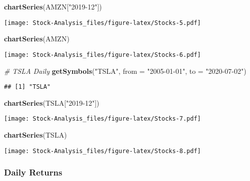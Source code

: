 \documentclass[
]{article}
\newenvironment{Shaded}{\begin{snugshade}}{\end{snugshade}}
\newcommand{\CommentTok}[1]{\textcolor[rgb]{0.56,0.35,0.01}{\textit{#1}}}
\newcommand{\DataTypeTok}[1]{\textcolor[rgb]{0.13,0.29,0.53}{#1}}
\newcommand{\KeywordTok}[1]{\textcolor[rgb]{0.13,0.29,0.53}{\textbf{#1}}}
\newcommand{\NormalTok}[1]{#1}
\newcommand{\StringTok}[1]{\textcolor[rgb]{0.31,0.60,0.02}{#1}}
\begin{document}
\begin{Shaded}
\begin{Highlighting}[]
\KeywordTok{chartSeries}\NormalTok{(AMZN[}\StringTok{"2019-12"}\NormalTok{])}
\end{Highlighting}
\end{Shaded}

\texttt{[image: Stock-Analysis\_files/figure-latex/Stocks-5.pdf]}

\begin{Shaded}
\begin{Highlighting}[]
\KeywordTok{chartSeries}\NormalTok{(AMZN)}
\end{Highlighting}
\end{Shaded}

\texttt{[image: Stock-Analysis\_files/figure-latex/Stocks-6.pdf]}

\begin{Shaded}
\begin{Highlighting}[]
\CommentTok{# TSLA Daily}
\KeywordTok{getSymbols}\NormalTok{(}\StringTok{"TSLA"}\NormalTok{,}
           \DataTypeTok{from =} \StringTok{"2005-01-01"}\NormalTok{,}
           \DataTypeTok{to =} \StringTok{"2020-07-02"}\NormalTok{)}
\end{Highlighting}
\end{Shaded}

\begin{verbatim}
## [1] "TSLA"
\end{verbatim}

\begin{Shaded}
\begin{Highlighting}[]
\KeywordTok{chartSeries}\NormalTok{(TSLA[}\StringTok{"2019-12"}\NormalTok{])}
\end{Highlighting}
\end{Shaded}

\texttt{[image: Stock-Analysis\_files/figure-latex/Stocks-7.pdf]}

\begin{Shaded}
\begin{Highlighting}[]
\KeywordTok{chartSeries}\NormalTok{(TSLA)}
\end{Highlighting}
\end{Shaded}

\texttt{[image: Stock-Analysis\_files/figure-latex/Stocks-8.pdf]}

\hypertarget{daily-returns}{%
\subsubsection{Daily Returns}\label{daily-returns}}
\end{document}
